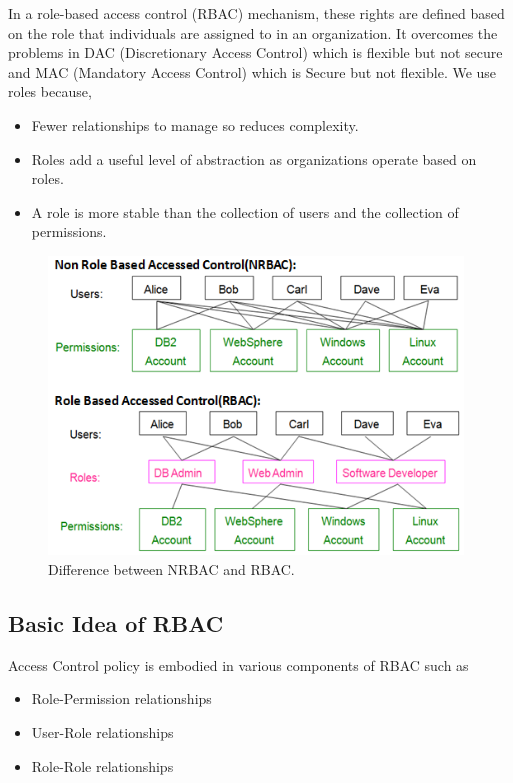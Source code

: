 \documentclass[12pt]{report}
\begin{document}
In a role-based access control (RBAC) mechanism, these rights are defined based on the role that individuals are assigned to in an organization. It overcomes the problems in DAC (Discretionary Access Control) which is flexible but not secure and MAC (Mandatory Access Control) which is Secure but not flexible. We use roles because,\\

	\begin{itemize}
		\item Fewer relationships to manage so reduces complexity.
		\item Roles add a useful level of abstraction as organizations operate based on roles.
		\item A role is more stable than the collection of users and the collection of permissions.
	\end{itemize}

	\begin{figure}[H]
	\begin{center}
	\includegraphics[width=11cm]{./4-1.png}
	\caption{ Difference between NRBAC and RBAC. \label{fig:Difference between NRBAC and RBAC. }}
	\end{center}
	\end{figure}
\newpage
	\subsection{Basic Idea of RBAC}
		Access Control policy is embodied in various components of RBAC such as 
		\begin{itemize}
		\item Role-Permission relationships
		\item User-Role relationships
		\item Role-Role relationships
		\end{itemize}
		
\end{document}
